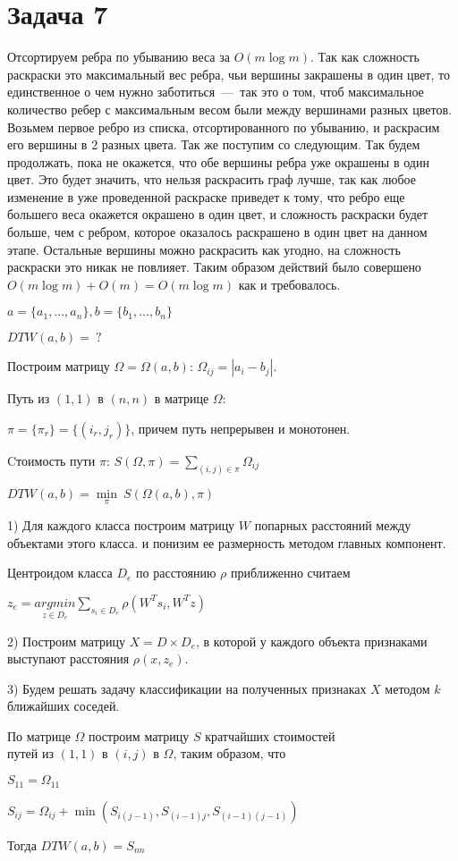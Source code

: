 \documentclass[a4paper,12pt]{article} %
\begin{document}
\section{Задача 7}
\hspace{5mm}
Отсортируем ребра по убыванию веса за $O(m\log m)$. Так как сложность раскраски это максимальный вес ребра, чьи вершины закрашены в один цвет, то единственное о чем нужно заботиться~---~так это о том, чтоб максимальное количество ребер с максимальным весом были между вершинами разных цветов. Возьмем первое ребро из списка, отсортированного по убыванию, и раскрасим его вершины в $2$ разных цвета. Так же поступим со следующим. Так будем продолжать, пока не окажется, что обе вершины ребра уже окрашены в один цвет. Это будет значить, что нельзя раскрасить граф лучше, так как любое изменение в уже проведенной раскраске приведет к тому, что ребро еще большего веса окажется окрашено в один цвет, и сложность раскраски будет больше, чем с ребром, которое оказалось раскрашено в один цвет на данном этапе. Остальные вершины можно раскрасить как угодно, на сложность раскраски это никак не повлияет. Таким образом действий было совершено $O(m\log m)+O(m)=O(m\log m)$ как и требовалось.


$a=\{a_1,\ldots, a_n\}, b =\{b_1,\ldots, b_n\}$

$DTW(a,b) =\ ?$

Построим матрицу $\Omega=\Omega(a,b)$: $\Omega_{ij}=|a_i-b_j|$.

Путь из $(1,1)$ в $(n,n)$ в матрице $\Omega$:

$\pi = \{\pi_r\}=\{(i_r,j_r)\}$, причем путь непрерывен и монотонен.

Cтоимость пути $\pi$: $S(\Omega,\pi)=\sum\limits_{(i,j)\in\pi}\Omega_{ij}$

$DTW(a,b)=\underset{\pi}{\min}\ S(\Omega(a,b),\pi)$


1) Для каждого класса построим матрицу $W$ попарных расстояний между объектами этого класса. и понизим ее размерность методом главных компонент.

Центроидом класса $D_e$ по расстоянию $\rho$ приближенно считаем

$z_e=\underset{z\in D_e}{argmin}\sum\limits_{s_i\in D_e}{\rho(W^T s_i,W^T z)}$

2) Построим матрицу $X=D\times D_e$, в которой у каждого объекта признаками выступают расстояния $\rho(x,z_e)$.

3) Будем решать задачу классификации на полученных признаках $X$ методом $k$ ближайших соседей.


По матрице $\Omega$ построим матрицу $S$ кратчайших стоимостей \\ путей из $(1,1)$ в $(i,j)$ в $\Omega$, таким образом, что

$S_{11}=\Omega_{11}$

$S_{ij}=\Omega_{ij}+\min(S_{i(j-1)},S_{(i-1)j},S_{(i-1)(j-1)})$

Тогда $DTW(a,b)=S_{nn}$
\end{document}
